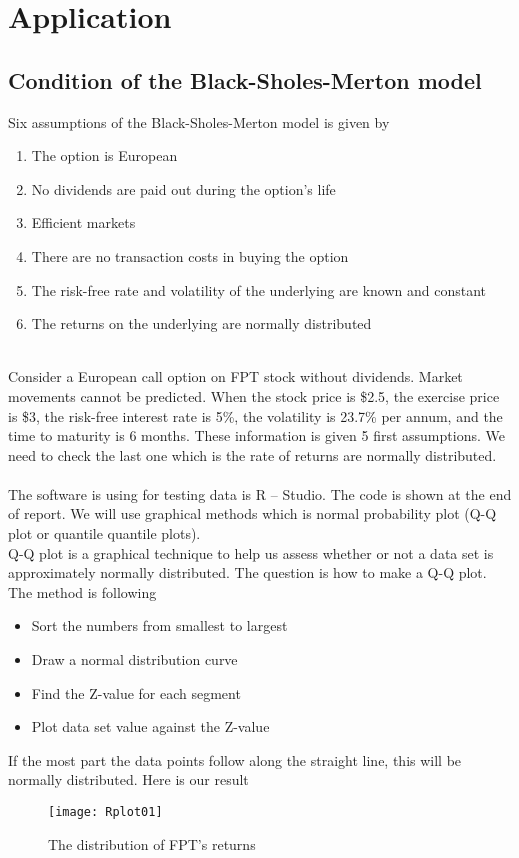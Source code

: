 \chapter{Application}
\label{ch:Appy}

\section{Condition of the Black-Sholes-Merton model}
Six assumptions of the Black-Sholes-Merton model is given by
\begin{enumerate}
	\item The option is European 
	\item No dividends are paid out during the option's life
	\item Efficient markets
	\item There are no transaction costs in buying the option
	\item The risk-free rate and volatility of the underlying are known and constant
	\item The returns on the underlying are normally distributed
\end{enumerate}
\\[0.5cm]
Consider a European call option on FPT stock without dividends. Market movements cannot be predicted. When the stock price is \$2.5, the exercise price is \$3, the risk-free interest rate is 5\%, the volatility is 23.7\% per annum,
and the time to maturity is 6 months. These information is given 5 first assumptions. We need to check the last one which is the rate of returns are normally distributed.\\
\\[0.5cm]
The software is using for testing data is R – Studio. The code is shown at the end of report. We will use graphical methods which is normal probability plot (Q-Q plot or quantile quantile plots). \\
Q-Q plot is a graphical technique to help us assess whether or not a data set is approximately normally distributed. The question is how to make a Q-Q plot. The method is following  
\begin{itemize}
\item Sort the numbers from smallest to largest
\item Draw a normal distribution curve
\item Find the Z-value for each segment
\item Plot data set value against the Z-value 
\end{itemize}
If the most part the data points follow along the straight line, this will be normally distributed. Here is our result
	\begin{figure}[htp]
	\begin{center}
		\texttt{[image: Rplot01]}
	\end{center}
	\label{refRplot01}
	\caption{The distribution of FPT's returns}
\end{figure}

